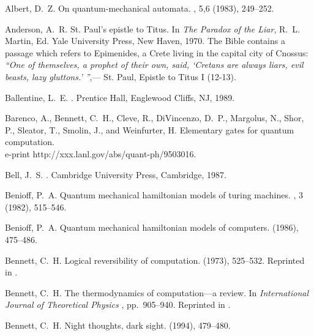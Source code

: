 \begin{thebibliography}{100}

{\sc Albert, D.~Z.}
\newblock On quantum-mechanical automata.
, 5,6 (1983), 249--252.

{\sc Anderson, A.~R.}
\newblock St. {P}aul's epistle to {T}itus.
\newblock In {\em The Paradox of the Liar}, R.~L. Martin, Ed. Yale University
  Press, New Haven, 1970.
\newblock The Bible contains a passage which refers to Epimenides, a Crete
  living in the capital city of Cnossus: {\it ``One of themselves, a prophet of
  their own, said, `Cretans are always liars, evil beasts, lazy gluttons.'
  ''},--- St. Paul, Epistle to Titus I (12-13).

{\sc Ballentine, L.~E.}
.
\newblock Prentice Hall, Englewood Cliffs, NJ, 1989.

{\sc Barenco, A., Bennett, C.~H., Cleve, R., DiVincenzo, D.~P., Margolus, N.,
  Shor, P., Sleator, T., Smolin, J., and Weinfurter, H.}
\newblock Elementary gates for quantum computation.
\newblock \\e-print http://xxx.lanl.gov/abs/quant-ph/9503016.

{\sc Bell, J.~S.}
.
\newblock Cambridge University Press, Cambridge, 1987.

{\sc Benioff, P.~A.}
\newblock Quantum mechanical hamiltonian models of turing machines.
, 3 (1982), 515--546.

{\sc Benioff, P.~A.}
\newblock Quantum mechanical hamiltonian models of computers.
 (1986),
  475--486.

{\sc Bennett, C.~H.}
\newblock Logical reversibility of computation.
 (1973), 525--532.
\newblock Reprinted in \cite[pp. 197-204]{maxwell-demon}.

{\sc Bennett, C.~H.}
\newblock The thermodynamics of computation---a review.
\newblock In {\em International Journal of Theoretical Physics\/}
  \cite{maxwell-demon}, pp.~905--940.
\newblock Reprinted in \cite[pp. 213-248]{maxwell-demon}.

{\sc Bennett, C.~H.}
\newblock Night thoughts, dark sight.
 (1994), 479--480.


\end{thebibliography}

